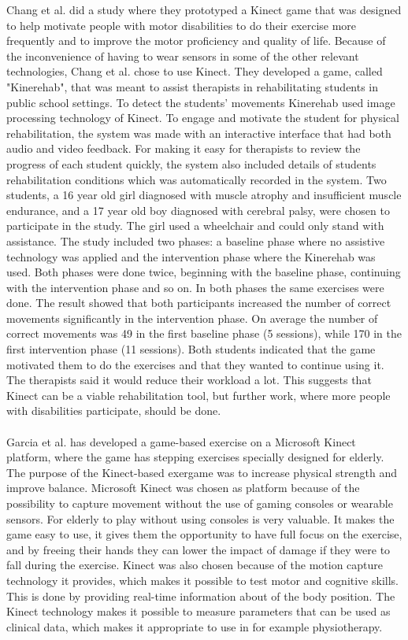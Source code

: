 Chang et al. \cite{kinect} did a study where they prototyped a Kinect game that was designed to help motivate people with motor disabilities to do their exercise more frequently and to improve the motor proficiency and quality of life. Because of the inconvenience of having to wear sensors in some of the other relevant technologies, Chang et al. chose to use Kinect. They developed a game, called "Kinerehab", that was meant to assist therapists in rehabilitating students in public school settings. To detect the students’ movements Kinerehab used image processing technology of Kinect. To engage and motivate the student for physical rehabilitation, the system was made with an interactive interface that had both audio and video feedback. For making it easy for therapists to review the progress of each student quickly, the system also included details of students rehabilitation conditions which was automatically recorded in the system. Two students, a 16 year old girl diagnosed with  muscle atrophy and insufficient muscle endurance, and a 17 year old boy diagnosed with cerebral palsy, were chosen to participate in the study. The girl used a wheelchair and could only stand with assistance. The study included two phases: a baseline phase  where no assistive technology was applied and the intervention phase where the Kinerehab was used. Both phases were done twice, beginning with the baseline phase, continuing with the intervention phase and so on. In both phases the same exercises were done. The result showed that both participants increased the number of correct movements significantly in the intervention phase. On average the number of correct movements was 49 in the first baseline phase (5 sessions), while 170 in the first intervention phase (11 sessions). Both students indicated that the game motivated them to do the exercises and that they wanted to continue using it. The therapists said it would reduce their workload a lot. This suggests that Kinect can be a viable rehabilitation tool, but further work, where more people with disabilities participate, should be done. \cite{kinect} \\ \\ 
Garcia et al. \cite{garcia2012exergames} has developed a game-based exercise on a Microsoft Kinect platform, where the game has stepping exercises specially designed for elderly. The purpose of the Kinect-based exergame was to increase physical strength and improve balance. Microsoft Kinect was chosen as platform because of the possibility to capture movement without the use of gaming consoles or wearable sensors. For elderly to play without using consoles is very valuable. It makes the game easy to use, it gives them the opportunity to have full focus on the exercise, and by freeing their hands they can lower the impact of damage if they were to fall during the exercise. Kinect was also chosen because of the motion capture technology it provides, which makes it possible to test motor and cognitive skills. This is done by providing real-time information about of the body position. The Kinect technology makes it possible to measure parameters that can be used as clinical data, which makes it appropriate to use in for example physiotherapy.
